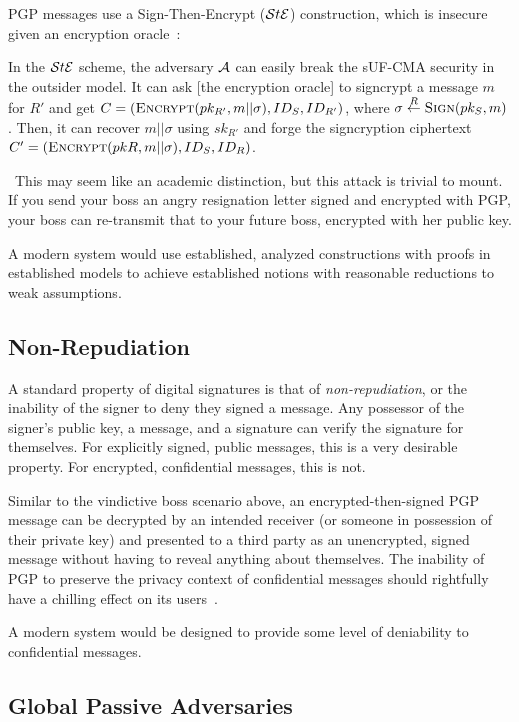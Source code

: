 PGP messages use a Sign-Then-Encrypt ($\mathcal{S}t\mathcal{E}$) construction, which is insecure given an encryption
oracle~\cite[p. 41]{an2010}:

\begin{displayquote}
    In the $\mathcal{S}t\mathcal{E}$ scheme, the adversary $\mathcal{A}$ can easily break the sUF-CMA security in the outsider model.
    It can ask [the encryption oracle] to signcrypt a message $m$ for $R'$ and get
    $C=(\textsc{Encrypt}(pk_{R'},m||\sigma),ID_S,ID_{R'})$, where $\sigma \stackrel{R}{\gets} \textsc{Sign}(pk_S,m)$.
    Then, it can recover $m||\sigma$ using $sk_{R'}$ and forge the signcryption ciphertext
    $C' = (\textsc{Encrypt}(pkR,m||\sigma),ID_S,ID_R)$.
\end{displayquote}

~This may seem like an academic distinction, but this attack is trivial to mount.
If you send your boss an angry resignation letter signed and encrypted with PGP, your boss can re-transmit that to your
future boss, encrypted with her public key.

A modern system would use established, analyzed constructions with proofs in established models to achieve established
notions with reasonable reductions to weak assumptions.

\subsection{Non-Repudiation}\label{subsec:non-repudiation}

A standard property of digital signatures is that of \emph{non-repudiation}, or the inability of the signer to deny they
signed a message.
Any possessor of the signer's public key, a message, and a signature can verify the signature for themselves.
For explicitly signed, public messages, this is a very desirable property.
For encrypted, confidential messages, this is not.

Similar to the vindictive boss scenario above, an encrypted-then-signed PGP message can be decrypted by an intended
receiver (or someone in possession of their private key) and presented to a third party as an unencrypted, signed
message without having to reveal anything about themselves.
The inability of PGP to preserve the privacy context of confidential messages should rightfully have a chilling effect
on its users~\cite{borisov2004}.

A modern system would be designed to provide some level of deniability to confidential messages.

\subsection{Global Passive Adversaries}\label{subsec:global-passive-adversaries}

